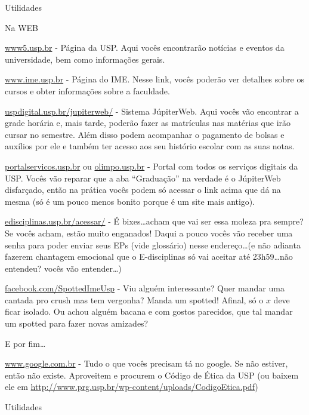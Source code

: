 \begin{secao}{Utilidades}

\begin{subsecao}{Na WEB}

\url{www5.usp.br} - Página da USP. Aqui vocês encontrarão notícias e eventos da
universidade, bem como informações gerais.

\url{www.ime.usp.br} - Página do IME. Nesse link, vocês poderão ver detalhes
sobre os cursos e obter informações sobre a faculdade.

\url{uspdigital.usp.br/jupiterweb/} - Sistema JúpiterWeb. Aqui vocês vão
encontrar a grade horária e, mais tarde, poderão fazer as matrículas nas
matérias que irão cursar no semestre. Além disso podem acompanhar o pagamento de
bolsas e auxílios por ele e também ter acesso aos seu histório escolar com as suas notas.

\url{portalservicos.usp.br} ou \url{olimpo.usp.br} - Portal com todos os serviços digitais
da USP. Vocês vão reparar que a aba ``Graduação'' na verdade é o JúpiterWeb disfarçado,
então na prática vocês podem só acessar o link acima que dá na mesma (só é um pouco menos
bonito porque é um site mais antigo).

\url{edisciplinas.usp.br/acessar/} - É bixes\dots acham que vai ser essa moleza pra sempre? Se
vocês acham, estão muito enganados! Daqui a pouco vocês vão receber uma senha para
poder enviar seus EPs (vide glossário) nesse endereço\dots (e não adianta fazerem
chantagem emocional que o E-disciplinas só vai aceitar até 23h59\dots não entendeu? vocês
vão entender\dots)

\url{facebook.com/SpottedImeUsp} - Viu alguém interessante? Quer mandar uma cantada
pro crush mas tem vergonha? Manda um spotted! Afinal, só o $x$ deve ficar isolado.
Ou achou alguém bacana e com gostos parecidos, que tal mandar um spotted para 
fazer novas amizades? 


E por fim\dots

\url{www.google.com.br} - Tudo o que vocês precisam tá no google. Se não estiver,
então não existe. Aproveitem e procurem o Código de Ética da USP (ou baixem ele em
\url{http://www.prg.usp.br/wp-content/uploads/CodigoEtica.pdf})

\end{subsecao}

\begin{secao}{Utilidades}


\end{secao}
\end{secao}
